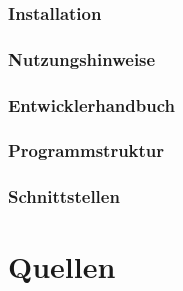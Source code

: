 \documentclass{article}
\begin{document}
    \subsubsection{Installation}

    \subsubsection{Nutzungshinweise}

\subsubsection{Entwicklerhandbuch}
    \subsubsection{Programmstruktur}

    \subsubsection{Schnittstellen}

\newpage
\section{Quellen}


\end{document}
